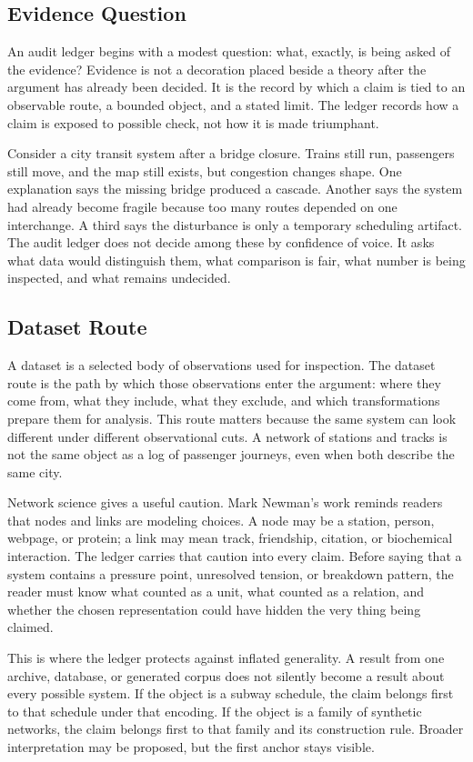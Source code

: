 \documentclass[11pt,a4paper,openany]{book}
\begin{document}
\subsection{Evidence Question}
An audit ledger begins with a modest question: what, exactly, is being asked of the evidence? Evidence is not a decoration placed beside a theory after the argument has already been decided. It is the record by which a claim is tied to an observable route, a bounded object, and a stated limit. The ledger records how a claim is exposed to possible check, not how it is made triumphant. \cite{newman_networks,barabasi_scale_free}\par
Consider a city transit system after a bridge closure. Trains still run, passengers still move, and the map still exists, but congestion changes shape. One explanation says the missing bridge produced a cascade. Another says the system had already become fragile because too many routes depended on one interchange. A third says the disturbance is only a temporary scheduling artifact. The audit ledger does not decide among these by confidence of voice. It asks what data would distinguish them, what comparison is fair, what number is being inspected, and what remains undecided.\par
\subsection{Dataset Route}
A dataset is a selected body of observations used for inspection. The dataset route is the path by which those observations enter the argument: where they come from, what they include, what they exclude, and which transformations prepare them for analysis. This route matters because the same system can look different under different observational cuts. A network of stations and tracks is not the same object as a log of passenger journeys, even when both describe the same city. \cite{newman_networks,barabasi_scale_free}\par
Network science gives a useful caution. Mark Newman's work reminds readers that nodes and links are modeling choices. A node may be a station, person, webpage, or protein; a link may mean track, friendship, citation, or biochemical interaction. The ledger carries that caution into every claim. Before saying that a system contains a pressure point, unresolved tension, or breakdown pattern, the reader must know what counted as a unit, what counted as a relation, and whether the chosen representation could have hidden the very thing being claimed.\par
This is where the ledger protects against inflated generality. A result from one archive, database, or generated corpus does not silently become a result about every possible system. If the object is a subway schedule, the claim belongs first to that schedule under that encoding. If the object is a family of synthetic networks, the claim belongs first to that family and its construction rule. Broader interpretation may be proposed, but the first anchor stays visible.\par
\end{document}

